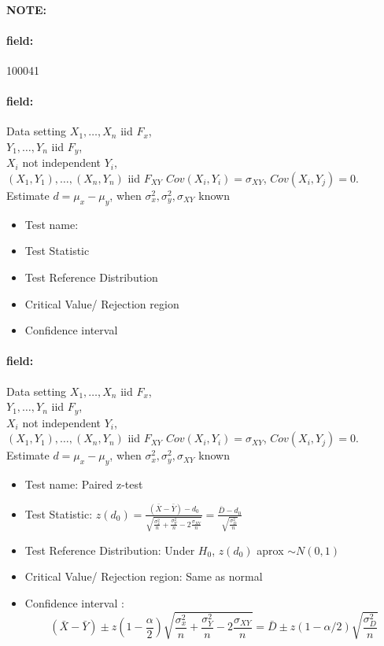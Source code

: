 \documentclass[12pt]{article}
\newenvironment{note}{\paragraph{NOTE:}}{}
\newenvironment{field}{\paragraph{field:}}{}
\begin{document}
\begin{note} \begin{field} \tiny 100041 \end{field}
 \begin{field}
   Data setting $X_1, \ldots , X_n$ iid $F_x$,\\
    $Y_1, \ldots, Y_n$ iid $F_y$,\\
     $X_i$ not independent $Y_i$,\\
      $(X_1, Y_1), \ldots , (X_n,Y_n)$ iid $F_{XY}$ $Cov(X_i,Y_i) = \sigma_{XY}$, $Cov(X_i,Y_j) = 0$. \\
      Estimate $d = \mu_x - \mu_y$, when $\sigma_x^2, \sigma_y^2, \sigma_{XY}$ known
  \begin{itemize}
   \item Test name:
   \item Test Statistic
   \item Test Reference Distribution
   \item Critical Value/ Rejection region
   \item Confidence interval
  \end{itemize}
 \end{field}
 \begin{field}
  Data setting $X_1, \ldots , X_n$ iid $F_x$,\\
   $Y_1, \ldots, Y_n$ iid $F_y$,\\
    $X_i$ not independent $Y_i$,\\
     $(X_1, Y_1), \ldots , (X_n,Y_n)$ iid $F_{XY}$ $Cov(X_i,Y_i) = \sigma_{XY}$, $Cov(X_i,Y_j) = 0$. \\
     Estimate $d = \mu_x - \mu_y$, when $\sigma_x^2, \sigma_y^2, \sigma_{XY}$ known
  \begin{itemize}
   \item Test name: Paired z-test
   \item Test Statistic: $z(d_0) = \frac{(\bar{X} - \bar{Y}) - d_0}{\sqrt{\frac{\sigma_x^2}{n} + \frac{\sigma_Y^2}{n} - 2 \frac{\sigma_{XY}}{n}}} = \frac{\bar{D} - d_0}{\sqrt{\frac{\sigma_D^2}{n}}}$
   \item Test Reference Distribution: Under $H_0$, $z(d_0) $ aprox $\sim N(0,1)$
   \item Critical Value/ Rejection region: Same as normal
   \item Confidence interval : $$(\bar{X} - \bar{Y}) \pm z(1 - \frac{\alpha}{2})\sqrt{\frac{\sigma_x^2}{n} + \frac{\sigma_Y^2}{n} - 2 \frac{\sigma_{XY}}{n}} = \bar{D} \pm z(1 - \alpha/2) \sqrt{\frac{\sigma_D^2}{n}}$$
  \end{itemize}
 \end{field}
\end{note}
\end{document}
